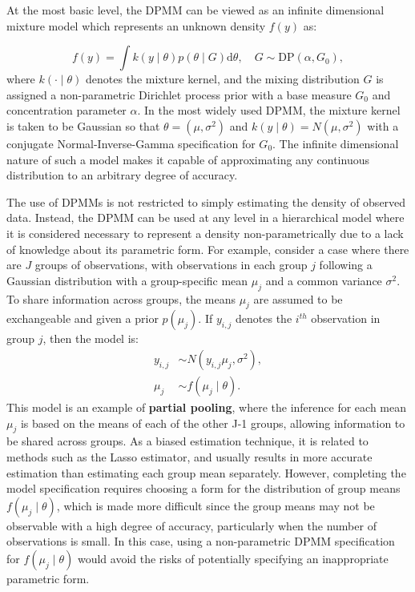 \documentclass[nojss]{jss}
\begin{document}
At the most basic level, the DPMM can be viewed as an infinite dimensional mixture model which represents an unknown density $f(y)$ as:

\begin{equation}
f(y) = \int k(y \mid \theta) p(\theta \mid G) \mathrm{d} \theta, \quad G \sim \text{DP}(\alpha, G_0),
\end{equation}
where $k(\cdot \mid \theta)$ denotes the mixture kernel, and the mixing distribution $G$ is assigned a non-parametric Dirichlet process prior with a base measure $G_0$ and concentration parameter $\alpha$. In the most widely used DPMM, the mixture kernel is taken to be Gaussian so that $\theta = (\mu,\sigma^2)$ and $k(y\mid\theta) = N(\mu,\sigma^2)$ with a conjugate Normal-Inverse-Gamma specification for $G_0$. The infinite dimensional nature of such a model makes it capable of approximating any continuous distribution to an arbitrary degree of accuracy.

The use of DPMMs is not restricted to simply estimating the density of observed data. Instead, the DPMM can be used at any level in a hierarchical model where it is considered necessary to represent a density non-parametrically due to a lack of knowledge about its parametric form. For example, consider a case where there are $J$ groups of observations, with observations in each group $j$ following a Gaussian distribution with a group-specific mean $\mu_j$ and a common variance $\sigma^2$. To share information across groups, the means $\mu_j$ are assumed to be exchangeable and given a prior $p(\mu_j)$. If $y_{i,j}$ denotes the $i^{th}$ observation in group $j$, then the model is:
\begin{align*}
y_{i,j} & \sim N(y_{i,j}\mu_j,\sigma^2), \\
\mu_j & \sim f(\mu_j \mid \theta).
\end{align*}
This model is an example of \textbf{partial pooling}, where the inference for each mean $\mu_j$ is based on the means of each of the other J-1 groups, allowing information to be shared across groups. As a biased estimation technique, it is related to methods such as the Lasso estimator, and usually results in more accurate estimation than estimating each group mean separately. However, completing the model specification requires choosing a form for the distribution of group means $f(\mu_j \mid \theta) $, which is made more difficult since the group means may not be observable with a high degree of accuracy, particularly when the number of observations is small. In this case, using a non-parametric DPMM specification for $f(\mu_j \mid \theta) $ would avoid the risks of potentially specifying an inappropriate parametric form.
\end{document}
